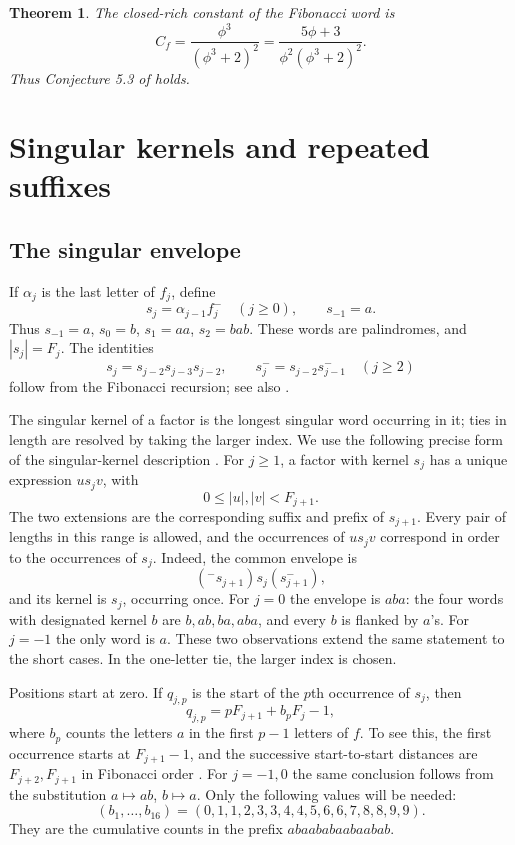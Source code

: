 \documentclass[11pt]{amsart}
\newtheorem{theorem}{Theorem}[section]
\begin{document}
\begin{theorem}\label{thm:Cf}
The closed-rich constant of the Fibonacci word is
\[
 \boxed{\displaystyle
 C_f=\frac{\phi^3}{(\phi^3+2)^2}
 =\frac{5\phi+3}{\phi^2(\phi^3+2)^2}.}
\]
Thus Conjecture 5.3 of \cite{MP} holds.
\end{theorem}

\section{Singular kernels and repeated suffixes}

\subsection{The singular envelope}
If $\alpha_j$ is the last letter of $f_j$, define
\[
 s_j=\alpha_{j-1}f_j^-\quad(j\ge0),\qquad s_{-1}=a.
\]
Thus $s_{-1}=a$, $s_0=b$, $s_1=aa$, $s_2=bab$.  These words are
palindromes, and $|s_j|=F_j$.  The identities
\begin{equation}\label{eq:singid}
 s_j=s_{j-2}s_{j-3}s_{j-2},\qquad
 s_j^-=s_{j-2}s_{j-1}^- \quad(j\ge2)
\end{equation}
follow from the Fibonacci recursion; see also \cite[Lemma 3.1]{HW}.

The singular kernel of a factor is the longest singular word occurring in it; ties in length are resolved by taking the larger index.
We use the following precise form of the singular-kernel description
\cite[Proposition 1.7, Theorem 2.1 and Corollary 3.4]{HW}.  For $j\ge1$,
a factor with kernel $s_j$ has a unique expression $u s_j v$, with
\[
 0\le |u|,|v|<F_{j+1}.
\]
The two extensions are the corresponding suffix and prefix of
$s_{j+1}$.  Every pair of lengths in this range is allowed, and the
occurrences of $u s_jv$ correspond in order to the occurrences of $s_j$.
Indeed, the common envelope is
\[
 ({}^-s_{j+1})s_j(s_{j+1}^-),
\]
and its kernel is $s_j$, occurring once.
For $j=0$ the envelope is $aba$: the four words with designated kernel
$b$ are $b,ab,ba,aba$, and every $b$ is flanked by $a$'s.
For $j=-1$ the only word is $a$.  These two observations extend the same
statement to the short cases.  In the one-letter tie, the larger index
is chosen.

Positions start at zero.  If $q_{j,p}$ is the start of the $p$th
occurrence of $s_j$, then
\begin{equation}\label{eq:q}
 q_{j,p}=pF_{j+1}+b_pF_j-1,
\end{equation}
where $b_p$ counts the letters $a$ in the first $p-1$ letters of $f$.
To see this, the first occurrence starts at $F_{j+1}-1$, and the
successive start-to-start distances are $F_{j+2},F_{j+1}$ in Fibonacci
order \cite[Proposition 1.7]{HW}.  For $j=-1,0$ the same conclusion
follows from the substitution $a\mapsto ab$, $b\mapsto a$.
Only the following values will be needed:
\begin{equation}\label{eq:bp}
 (b_1,\ldots,b_{16})=(0,1,1,2,3,3,4,4,5,6,6,7,8,8,9,9).
\end{equation}
They are the cumulative counts in the prefix $abaababaabaabab$.
\end{document}
